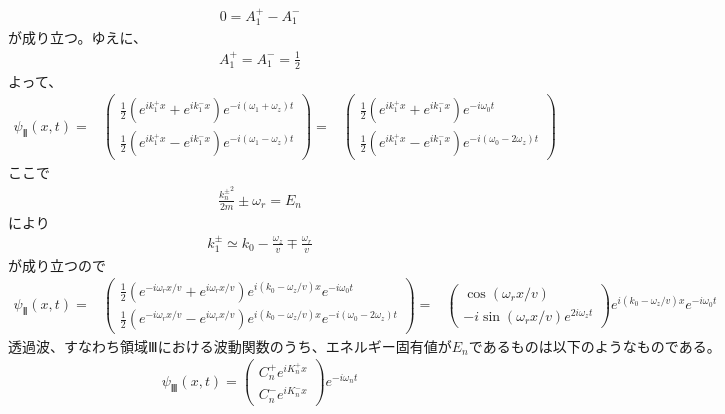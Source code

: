 \begin{align}
0=A_{1}^{+}-A_{1}^{-}
\end{align}
が成り立つ。ゆえに、
\begin{align}
A_{1}^{+}=A_{1}^{-}=\frac{1}{2}
\end{align}
よって、
\begin{align}
{\psi}_{Ⅱ}(x,t) 
=&\begin{pmatrix}
\frac{1}{2}\left(e^{ik_{1}^{+}x}+e^{ik_{1}^{-}x}\right)e^{-i(\omega_{1}+\omega_{z})t} \\
\frac{1}{2}\left(e^{ik_{1}^{+}x}-e^{ik_{1}^{-}x}\right)e^{-i(\omega_{1}-\omega_{z})t}
\end{pmatrix}
=&\begin{pmatrix}
\frac{1}{2}\left(e^{ik_{1}^{+}x}+e^{ik_{1}^{-}x}\right)e^{-i\omega_{0}t} \\
\frac{1}{2}\left(e^{ik_{1}^{+}x}-e^{ik_{1}^{-}x}\right)e^{-i(\omega_{0}-2\omega_{z})t}
\end{pmatrix}
\end{align}
ここで
\begin{align}
\frac{{k_{n}^{\pm}}^2}{2m}{\pm}\omega_{r}=E_{n}
\end{align}
により
\begin{align}
k_{1}^{\pm}{\simeq}k_{0}-\frac{\omega_{z}}{v}{\mp}\frac{\omega_{r}}{v}
\end{align}
が成り立つので
\begin{align}
{\psi}_{Ⅱ}(x,t) 
=&\begin{pmatrix}
\frac{1}{2}\left(e^{-i{\omega_{r}}x/v}+e^{i{\omega_{r}}x/v}\right)e^{i(k_{0}-\omega_{z}/v)x}e^{-i\omega_{0}t} \\
\frac{1}{2}\left(e^{-i{\omega_{r}}x/v}-e^{i{\omega_{r}}x/v}\right)e^{i(k_{0}-\omega_{z}/v)x}e^{-i(\omega_{0}-2\omega_{z})t}
\end{pmatrix}
=&\begin{pmatrix}
\cos({{\omega_{r}}x/v}) \\
-i\sin({{\omega_{r}}x/v})e^{2i\omega_{z}t}
\end{pmatrix}
e^{i(k_{0}-\omega_{z}/v)x}e^{-i\omega_{0}t}
\end{align}
$透過波、すなわち領域Ⅲにおける波動関数のうち、エネルギー固有値がE_{n}であるものは以下のようなものである。$
\begin{align}
{\psi}_{Ⅲ}(x,t)=
\begin{pmatrix}
C_{n}^{+}e^{iK_{n}^{+}x} \\
C_{n}^{-}e^{iK_{n}^{-}x}
\end{pmatrix}
e^{-i\omega_{n}t}
\end{align}
